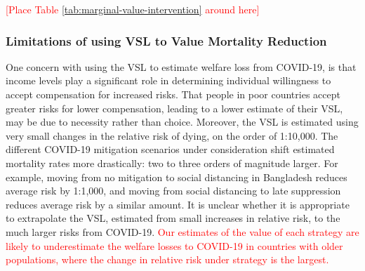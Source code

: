 \documentclass[11pt]{article}
\begin{document}
\begin{mdframed}
\begin{center}
    \textcolor{red}{[Place Table \ref{tab:marginal-value-intervention} around here]}
\end{center}

\subsubsection{Limitations of using VSL to Value Mortality Reduction}

One concern with using the VSL to estimate welfare loss from COVID-19, is that income levels play a significant role in determining individual willingness to accept compensation for increased risks. That people in poor countries accept greater risks for lower compensation, leading to a lower estimate of their VSL, may be due to necessity rather than choice. Moreover, the VSL is estimated using very small changes in the relative risk of dying, on the order of 1:10,000. The different COVID-19 mitigation scenarios under consideration shift estimated mortality rates more drastically: two to three orders of magnitude larger. For example, moving from no mitigation to social distancing in Bangladesh reduces average risk by 1:1,000, and moving from social distancing to late suppression reduces average risk by a similar amount. It is unclear whether it is appropriate to extrapolate the  VSL, estimated from small increases in relative risk, to the much larger risks from COVID-19. \textcolor{red}{Our estimates of the value of each strategy are likely to underestimate the welfare losses to COVID-19 in countries with older populations, where the change in relative risk under strategy is the largest.}






\end{mdframed}
\end{document}
